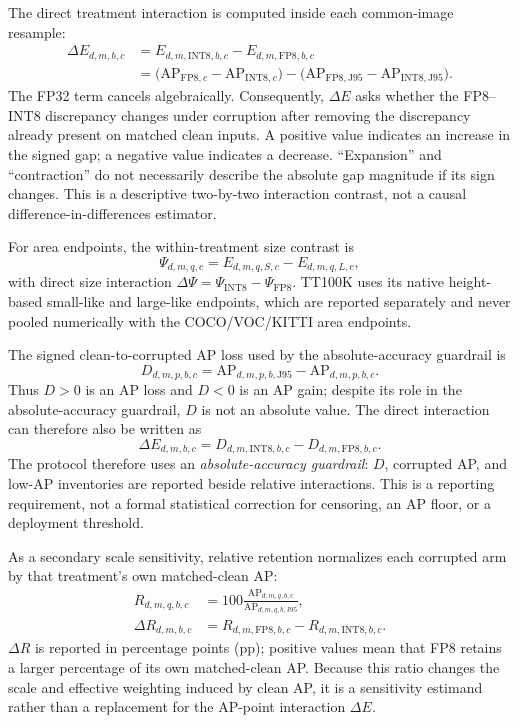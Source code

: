 \documentclass[10pt]{article}
\newcommand{\AP}{\mathrm{AP}}
\newcommand{\Jclean}{\mathrm{J95}}
\newcommand{\DeltaE}{\Delta E}
\newcommand{\DeltaR}{\Delta R}
\newcommand{\DeltaPsi}{\Delta\Psi}
\begin{document}
The direct treatment interaction is computed inside each common-image resample:
\begin{align}
\DeltaE_{d,m,b,c}
 &= E_{d,m,\mathrm{INT8},b,c}-E_{d,m,\mathrm{FP8},b,c}\\
 &= \bigl(\AP_{\mathrm{FP8},c}-\AP_{\mathrm{INT8},c}\bigr)
  -\bigl(\AP_{\mathrm{FP8},\Jclean}-\AP_{\mathrm{INT8},\Jclean}\bigr).
\end{align}
The FP32 term cancels algebraically. Consequently, $\DeltaE$ asks whether the
FP8--INT8 discrepancy changes under corruption after removing the discrepancy
already present on matched clean inputs. A positive value indicates an increase
in the signed gap; a negative value indicates a decrease. ``Expansion'' and
``contraction'' do not necessarily describe the absolute gap magnitude if its
sign changes. This is a descriptive two-by-two
interaction contrast, not a causal difference-in-differences estimator.

For area endpoints, the within-treatment size contrast is
\begin{equation}
\Psi_{d,m,q,c}=E_{d,m,q,S,c}-E_{d,m,q,L,c},
\end{equation}
with direct size interaction $\DeltaPsi=\Psi_{\mathrm{INT8}}-
\Psi_{\mathrm{FP8}}$. TT100K uses its native height-based small-like and
large-like endpoints, which are reported separately and never pooled
numerically with the COCO/VOC/KITTI area endpoints.

The signed clean-to-corrupted AP loss used by the absolute-accuracy guardrail is
\begin{equation}
D_{d,m,p,b,c}=\AP_{d,m,p,b,\Jclean}-\AP_{d,m,p,b,c}.
\end{equation}
Thus $D>0$ is an AP loss and $D<0$ is an AP gain; despite its role in the
absolute-accuracy guardrail, $D$ is not an absolute value.
The direct interaction can therefore also be written as
\begin{equation}
\Delta E_{d,m,b,c}=D_{d,m,\mathrm{INT8},b,c}-D_{d,m,\mathrm{FP8},b,c}.
\end{equation}
The protocol therefore uses an \emph{absolute-accuracy guardrail}: $D$, corrupted AP, and low-AP
inventories are reported beside relative interactions. This is a reporting requirement, not a formal
statistical correction for censoring, an AP floor, or a deployment threshold.

As a secondary scale sensitivity, relative retention normalizes each corrupted
arm by that treatment's own matched-clean AP:
\begin{align}
R_{d,m,q,b,c}
 &=100\frac{\AP_{d,m,q,b,c}}{\AP_{d,m,q,b,\Jclean}},\\
\DeltaR_{d,m,b,c}
 &=R_{d,m,\mathrm{FP8},b,c}-R_{d,m,\mathrm{INT8},b,c}.
\end{align}
$\DeltaR$ is reported in percentage points (pp); positive values mean that FP8
retains a larger percentage of its own matched-clean AP. Because this ratio
changes the scale and effective weighting induced by clean AP, it is a
sensitivity estimand rather than a replacement for the AP-point interaction
$\DeltaE$.
\end{document}
